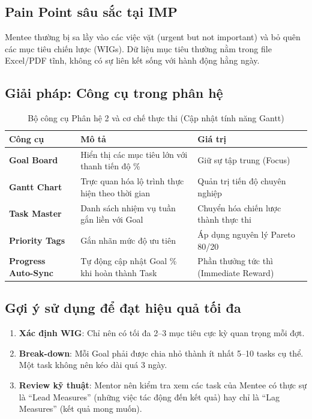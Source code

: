 \subsection{Pain Point sâu sắc tại IMP}
Mentee thường bị sa lầy vào các việc vặt (urgent but not important) và bỏ quên các mục tiêu chiến lược (WIGs). Dữ liệu mục tiêu thường nằm trong file Excel/PDF tĩnh, không có sự liên kết sống với hành động hằng ngày.

\subsection{Giải pháp: Công cụ trong phân hệ}

\begin{table}[H]
  \centering
  \begin{tabularx}{\textwidth}{|L|L|L|}
    \hline
     \textbf{\color{white} Công cụ} & \textbf{\color{white} Mô tả} & \textbf{\color{white} Giá trị} \\ \hline
    \textbf{Goal Board} & Hiển thị các mục tiêu lớn với thanh tiến độ \% & Giữ sự tập trung (Focus) \\ \hline
    \textbf{Gantt Chart} & Trực quan hóa lộ trình thực hiện theo thời gian & Quản trị tiến độ chuyên nghiệp \\ \hline
    \textbf{Task Master} & Danh sách nhiệm vụ tuần gắn liền với Goal & Chuyển hóa chiến lược thành thực thi \\ \hline
    \textbf{Priority Tags} & Gắn nhãn mức độ ưu tiên & Áp dụng nguyên lý Pareto 80/20 \\ \hline
    \textbf{Progress Auto-Sync} & Tự động cập nhật Goal \% khi hoàn thành Task & Phần thưởng tức thì (Immediate Reward) \\ \hline
  \end{tabularx}
  \caption{Bộ công cụ Phân hệ 2 và cơ chế thực thi (Cập nhật tính năng Gantt)}
\end{table}

\subsection{Gợi ý sử dụng để đạt hiệu quả tối đa}
\begin{enumerate}
    \item \textbf{Xác định WIG}: Chỉ nên có tối đa 2--3 mục tiêu cực kỳ quan trọng mỗi đợt.
    \item \textbf{Break-down}: Mỗi Goal phải được chia nhỏ thành ít nhất 5--10 tasks cụ thể. Một task không nên kéo dài quá 3 ngày.
    \item \textbf{Review kỹ thuật}: Mentor nên kiểm tra xem các task của Mentee có thực sự là ``Lead Measures'' (những việc tác động đến kết quả) hay chỉ là ``Lag Measures'' (kết quả mong muốn).
\end{enumerate}

